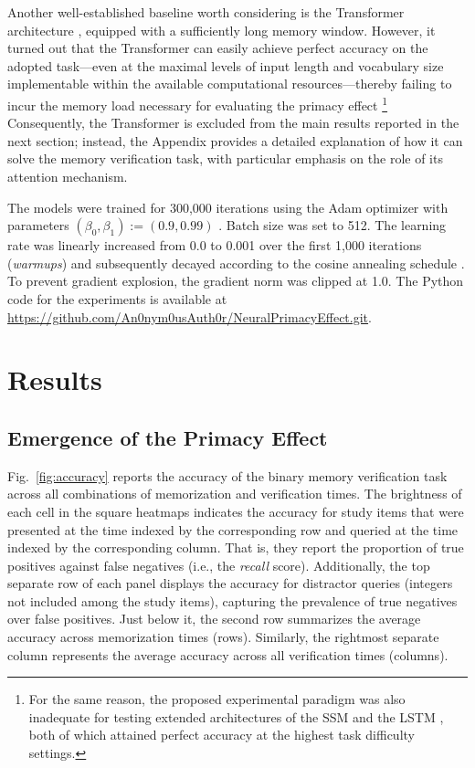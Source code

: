 \documentclass[10pt,letterpaper]{article}
\begin{document}
Another well-established baseline worth considering is the Transformer architecture \citep[][]{Vaswani+17_AttentionIsAllYouNeed}, equipped with a sufficiently long memory window.
However, it turned out that the Transformer can easily achieve perfect accuracy on the adopted task---even at the maximal levels of input length and vocabulary size implementable within the available computational resources---thereby failing to incur the memory load necessary for evaluating the primacy effect%
\footnote{
	For the same reason, the proposed experimental paradigm was also inadequate for testing extended architectures of the SSM \citep[Mamba;][]{GuDao24,DaoGu24} and the LSTM \citep[xLSTM;][]{Beck+24}, both of which attained perfect accuracy at the highest task difficulty settings.}
Consequently, the Transformer is excluded from the main results reported in the next section; instead, the Appendix provides a detailed explanation of how it can solve the memory verification task, with particular emphasis on the role of its attention mechanism.

The models were trained for 300,000 iterations using the Adam optimizer with parameters $(\beta_0,\beta_1) := (0.9,0.99)$ \citep{KingmaBa15_Adam}.
Batch size was set to 512.
The learning rate was linearly increased from 0.0 to 0.001 over the first 1,000 iterations (\emph{warmups}) and subsequently decayed according to the cosine annealing schedule \cite{LoshchilovHutter17}.
To prevent gradient explosion, the gradient norm was clipped at 1.0.
The Python code for the experiments is available at \url{https://github.com/An0nym0usAuth0r/NeuralPrimacyEffect.git}.



\section{Results}

\subsection{Emergence of the Primacy Effect}

Fig.~\ref{fig:accuracy} reports the accuracy of the binary memory verification task across all combinations of memorization and verification times.
The brightness of each cell in the square heatmaps indicates the accuracy for study items that were presented at the time indexed by the corresponding row and queried at the time indexed by the corresponding column.
That is, they report the proportion of true positives against false negatives (i.e., the \emph{recall} score).
Additionally, the top separate row of each panel displays the accuracy for distractor queries (integers not included among the study items), capturing the prevalence of true negatives over false positives.
Just below it, the second row summarizes the average accuracy across memorization times (rows).
Similarly, the rightmost separate column represents the average accuracy across all verification times (columns).
\end{document}
